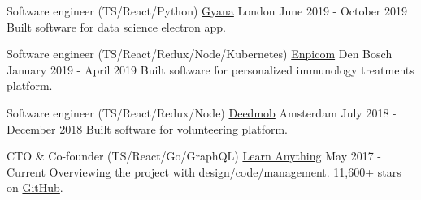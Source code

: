 
\begin{cventries}

  \cventry
    {Software engineer (TS/React/Python)}
    {\href{https://www.gyana.co.uk}{Gyana}}
    {London}
    {June 2019 - October 2019}
    {
      {Built software for data science electron app.}
    }

  \cventry
    {Software engineer (TS/React/Redux/Node/Kubernetes)}
    {\href{https://www.enpicom.com}{Enpicom}}
    {Den Bosch}
    {January 2019 - April 2019}
    {
      {Built software for personalized immunology treatments platform.}
    }

  \cventry
    {Software engineer (TS/React/Redux/Node)}
    {\href{https://www.deedmob.com}{Deedmob}}
    {Amsterdam}
    {July 2018 - December 2018}
    {
      {Built software for volunteering platform.}
    }

  \cventry
    {CTO \& Co-founder (TS/React/Go/GraphQL)}
    {\href{https://learn-anything.xyz}{Learn Anything}}
    {}
    {May 2017 - Current}
    {
      {Overviewing the project with design/code/management. 11,600+ stars on \href{https://github.com/learn-anything/learn-anything}{GitHub}.}
    }

\end{cventries}
